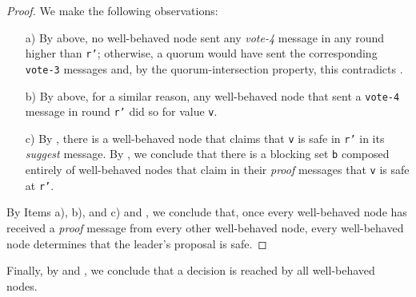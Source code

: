 \documentclass[11pt]{article}
\begin{document}
\begin{proof}
  We make the following observations:
  \begin{enumerate}
    \item[a)] By  above, no well-behaved node sent any \textit{vote-4} message in any round higher than \texttt{r'}; otherwise, a quorum would have sent the corresponding \texttt{vote-3} messages and, by the quorum-intersection property, this contradicts .
    \item[b)] By  above, for a similar reason, any well-behaved node that sent a \texttt{vote-4} message in round \texttt{r'} did so for value \texttt{v}.
    \item[c)] By , there is a well-behaved node that claims that \texttt{v} is safe in \texttt{r'} in its \textit{suggest} message. By , we conclude that there is a blocking set \texttt{b} composed entirely of well-behaved nodes that claim in their \textit{proof} messages that \texttt{v} is safe at \texttt{r'}.
  \end{enumerate}
  By Items a), b), and c) and , we conclude that, once every well-behaved node has received a \textit{proof} message from every other well-behaved node, every well-behaved node determines that the leader's proposal is safe.
\end{proof}

Finally, by  and
, we conclude that a decision is reached
by all well-behaved nodes.
\end{document}
